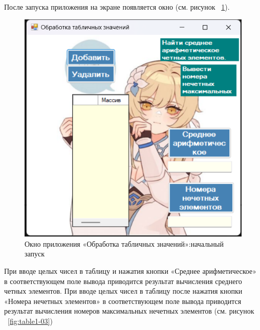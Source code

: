 \documentclass[bachelor, och, pract, times]{SCWorks}
\begin{document}
После запуска приложения на экране появляется окно (см. рисунок ~\ref{fig:table1-02}).

\begin{figure}[H]
    \centering
    \includegraphics[scale=0.7]{Скрины/Снимок экрана 2025-01-03 222945.png}
    \caption{Окно приложения «Обработка табличных значений»:начальный запуск}\label{fig:table1-02}
\end{figure}

При вводе целых чисел в таблицу и нажатия
кнопки «Среднее арифметическое» в соответствующем поле вывода приводится результат вычисления среднего четных элементов.
При вводе целых чисел в таблицу после нажатия кнопки «Номера нечетных элементов» в соответствующем поле вывода приводится результат вычисления номеров максимальных нечетных элементов (см. рисунок ~\ref{fig:table1-03})
\end{document}
